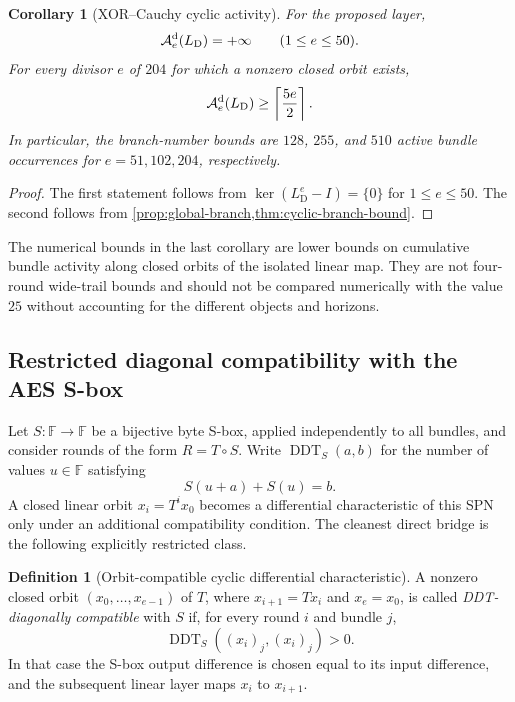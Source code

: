 \documentclass[10pt,reqno]{amsart}
\theoremstyle{plain}
\newtheorem{corollary}[theorem]{Corollary}
\theoremstyle{remark}\newtheorem{remark}[theorem]{Remark}
\theoremstyle{definition}\newtheorem{definition}[theorem]{Definition}
\newcommand{\F}{\mathbb F}
\begin{document}
\begin{corollary}[XOR--Cauchy cyclic activity]\label{cor:wh-cyclic-activity}
For the proposed layer,
\[
\mathcal A_e^{\rm d}(L_{\mathrm{D}})=+\infty
\qquad(1\le e\le50).
\]
For every divisor $e$ of $204$ for which a nonzero closed orbit exists,
\[
\mathcal A_e^{\rm d}(L_{\mathrm{D}})\ge\left\lceil\frac{5e}{2}\right\rceil.
\]
In particular, the branch-number bounds are $128$, $255$, and $510$ active bundle occurrences for $e=51,102,204$, respectively.
\end{corollary}
\begin{proof}
The first statement follows from $\ker(L_{\mathrm{D}}^e-I)=\{0\}$ for $1\le e\le50$. The second follows from \cref{prop:global-branch,thm:cyclic-branch-bound}. \end{proof}

The numerical bounds in the last corollary are lower bounds on cumulative bundle activity along closed orbits of the isolated linear map. They are not four-round wide-trail bounds and should not be compared numerically with the value $25$ without accounting for the different objects and horizons.

\subsection{Restricted diagonal compatibility with the AES S-box}
Let $S:\F\to\F$ be a bijective byte S-box, applied independently to all bundles, and consider rounds of the form $R=T\circ S$. Write $\operatorname{DDT}_S(a,b)$ for the number of values $u\in\F$ satisfying
\[
S(u+a)+S(u)=b.
\]
A closed linear orbit $x_i=T^i x_0$ becomes a differential characteristic of this SPN only under an additional compatibility condition. The cleanest direct bridge is the following explicitly restricted class.

\begin{definition}[Orbit-compatible cyclic differential characteristic]\label{def:orbit-compatible}
A nonzero closed orbit $(x_0,\ldots,x_{e-1})$ of $T$, where $x_{i+1}=Tx_i$ and $x_e=x_0$, is called \emph{DDT-diagonally compatible} with $S$ if, for every round $i$ and bundle $j$,
\[
\operatorname{DDT}_S((x_i)_j,(x_i)_j)>0.
\]
In that case the S-box output difference is chosen equal to its input difference, and the subsequent linear layer maps $x_i$ to $x_{i+1}$.
\end{definition}
\end{document}
